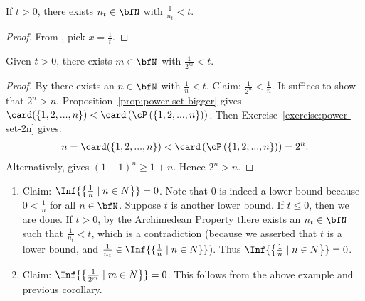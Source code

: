     \begin{proposition}\label{prop:arch-2}
        If $t > 0$, there exists $n_t \in \bfN$ with $\frac{1}{n_t} < t$.
    \end{proposition}
        \begin{proof}
            From , pick $x = \frac{1}{t}$.
        \end{proof}

    \begin{corollary}
        Given $t>0$, there exists $m \in \bfN$ with $\frac{1}{2^m} < t$.
    \end{corollary}
        \begin{proof}
            By  there exists an $n \in \bfN$ with $\frac{1}{n} < t$. Claim: $\frac{1}{2^n} < \frac{1}{n}$. It suffices to show that $2^n > n$. Proposition~\ref{prop:power-set-bigger} gives $\card(\{1,2,...,n\}) < \card\left({\cP\left(\{1,2,...,n\}\right)}\right)$. Then Exercise~\ref{exercise:power-set-2n} gives:
                \begin{equation*}
                \begin{split}
                    n = \card(\{1,2,...,n\}) < \card\left({\cP\left(\{1,2,...,n\}\right)}\right) = 2^n.
                \end{split}
                \end{equation*}
            Alternatively,  gives $(1+1)^n \geq 1 + n$. Hence $2^n > n$.
        \end{proof}

    \begin{example}
        \phantom{a}
        \begin{enumerate}[label = (\arabic*)]
            \item Claim: $\Inf{\left\{\frac{1}{n} \mid n \in N\right\}} = 0$. Note that $0$ is indeed a lower bound because $0 < \frac{1}{n}$ for all $n \in \bfN$. Suppose $t$ is another lower bound. If $t \leq 0$, then we are done. If $t > 0$, by the Archimedean Property there exists an $n_t \in \bfN$ such that $\frac{1}{n_t} < t$, which is a contradiction {\tiny (because we asserted that $t$ is a lower bound, and $\frac{1}{n_t} \in \Inf{\{\frac{1}{n} \mid n \in N\}}$)}. Thus $\Inf{\left\{\frac{1}{n} \mid n \in N\right\}} = 0$.
            \item Claim: $\Inf{\left\{\frac{1}{2^m} \mid m \in N\right\}} = 0$. This follows from the above example and previous corollary.
        \end{enumerate}
    \end{example}

